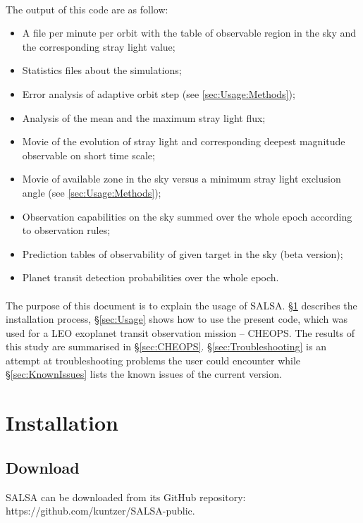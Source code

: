 \documentclass[a4paper,10pt]{article}
\begin{document}
\paragraph{}
The output of this code are as follow:
\begin{itemize}
 \item A file per minute per orbit with the table of observable region in the sky and the corresponding stray light value;
 \item Statistics files about the simulations;
 \item Error analysis of adaptive orbit step (see \ref{sec:Usage:Methods});
 \item Analysis of the mean and the maximum stray light flux;
 \item Movie of the evolution of stray light and corresponding deepest magnitude observable on short time scale;
 \item Movie of available zone in the sky versus a minimum stray light exclusion angle (see \ref{sec:Usage:Methods});
 \item Observation capabilities on the sky summed over the whole epoch according to observation rules;
 \item Prediction tables of observability of given target in the sky (beta version);
 \item Planet transit detection probabilities over the whole epoch.
\end{itemize}

\paragraph{}
The purpose of this document is to explain the usage of SALSA. \S\ref{sec:Installation} describes the installation process, \S\ref{sec:Usage} shows how to use the present code, which was used for a LEO exoplanet transit observation mission -- CHEOPS. The results of this study are summarised in \S\ref{sec:CHEOPS}. \S\ref{sec:Troubleshooting} is an attempt at troubleshooting problems the user could encounter while \S\ref{sec:KnownIssues} lists the known issues of the current version.

\section{Installation} \label{sec:Installation}
\subsection{Download}
SALSA can be downloaded from its GitHub repository: https://github.com/kuntzer/SALSA-public.
\end{document}
